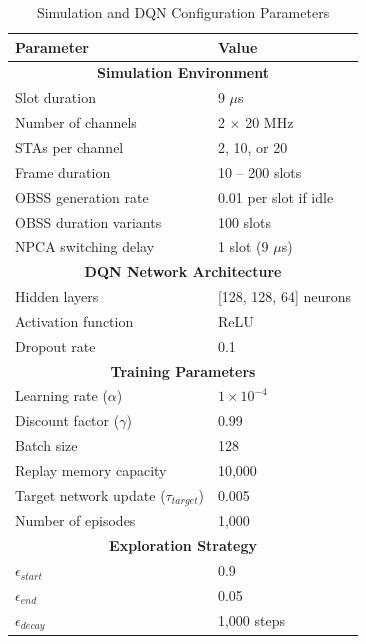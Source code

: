 \documentclass[conference]{IEEEtran}
\begin{document}
\begin{table}[htbp]
\caption{Simulation and DQN Configuration Parameters}
\begin{center}
\begin{tabular}{|l|l|}
\hline
\textbf{Parameter} & \textbf{Value} \\
\hline
\multicolumn{2}{|c|}{\textbf{Simulation Environment}} \\
\hline
Slot duration & 9 $\mu$s \\
Number of channels & 2 $\times$ 20 MHz \\
STAs per channel & 2, 10, or 20 \\
Frame duration & 10 -- 200 slots \\
OBSS generation rate & 0.01 per slot if idle \\
OBSS duration variants & 100 slots \\
NPCA switching delay & 1 slot (9 $\mu$s) \\
\hline
\multicolumn{2}{|c|}{\textbf{DQN Network Architecture}} \\
\hline
Hidden layers & [128, 128, 64] neurons \\
Activation function & ReLU \\
Dropout rate & 0.1 \\
\hline
\multicolumn{2}{|c|}{\textbf{Training Parameters}} \\
\hline
Learning rate ($\alpha$) & $1 \times 10^{-4}$ \\
Discount factor ($\gamma$) & 0.99 \\
Batch size & 128 \\
Replay memory capacity & 10,000 \\
Target network update ($\tau_{target}$) & 0.005 \\
Number of episodes & 1,000 \\
\hline
\multicolumn{2}{|c|}{\textbf{Exploration Strategy}} \\
\hline
$\epsilon_{start}$ & 0.9 \\
$\epsilon_{end}$ & 0.05 \\
$\epsilon_{decay}$ & 1,000 steps \\
\hline
\end{tabular}
\label{tab:simulation_params}
\end{center}
\end{table}
\end{document}
